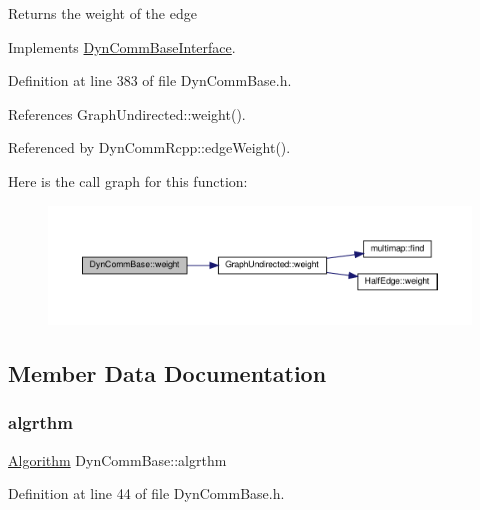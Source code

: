 \begin{DoxyReturn}{Returns}
the weight of the edge 
\end{DoxyReturn}


Implements \hyperlink{classDynCommBaseInterface_a31514affa49ac05ccf3318b3558cf0b2}{Dyn\+Comm\+Base\+Interface}.



Definition at line 383 of file Dyn\+Comm\+Base.\+h.



References Graph\+Undirected\+::weight().



Referenced by Dyn\+Comm\+Rcpp\+::edge\+Weight().

Here is the call graph for this function\+:
\nopagebreak
\begin{figure}[H]
\begin{center}
\leavevmode
\includegraphics[width=350pt]{classDynCommBase_ae48a572da3c7b375429e96e717b15787_cgraph}
\end{center}
\end{figure}


\subsection{Member Data Documentation}
\mbox{\label{classDynCommBase_a966f54b7ba340fa782146659998760ed}} 
\subsubsection{\texorpdfstring{algrthm}{algrthm}}
{\footnotesize\ttfamily \hyperlink{classAlgorithm}{Algorithm} Dyn\+Comm\+Base\+::algrthm\hspace{0.3cm}{\ttfamily [private]}}



Definition at line 44 of file Dyn\+Comm\+Base.\+h.

\mbox{\label{classDynCommBase_ae79d443436131554acb4b3ed24908701}} 
